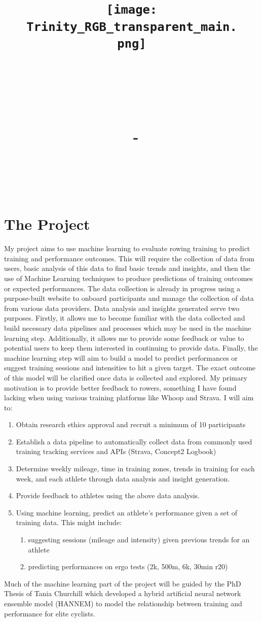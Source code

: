 \documentclass[a4paper]{article}
\title{
    \vspace{-1in}
    \begin{figure}[!ht]
    \flushleft
    \texttt{[image: Trinity\_RGB\_transparent\_main.png]}
    \end{figure}
    \vspace{-0.5cm}
    \hrulefill \\
    \vspace{1cm}
    \textmd{\textbf{\moduleCode\ \moduleName}}\\
    \textmd{\textbf{\assignmentTitle}}\\
    {
        \large
        \textmd{\authorName\ - \authorID}\\
        \textmd{\reportDate}\\
    }
    \vspace{0.5cm}
    \hrulefill \\
}
\date{}
\author{}
\begin{document}
\section{The Project}
My project aims to use machine learning to evaluate rowing training to predict training and performance outcomes. This will require the collection of data from users, basic analysis of this data to find basic trends and insights, and then the use of Machine Learning techniques to produce predictions of training outcomes or expected performances. 
The data collection is already in progress using a purpose-built website to onboard participants and manage the collection of data from various data providers. 
Data analysis and insights generated serve two purposes. Firstly, it allows me to become familiar with the data collected and build necessary data pipelines and processes which may be used in the machine learning step. Additionally, it allows me to provide some feedback or value to potential users to keep them interested in continuing to provide data. 
Finally, the machine learning step will aim to build a model to predict performances or suggest training sessions and intensities to hit a given target. The exact outcome of this model will be clarified once data is collected and explored. My primary motivation is to provide better feedback to rowers, something I have found lacking when using various training platforms like Whoop and Strava.
I will aim to:
\begin{enumerate}
    \item Obtain research ethics approval and recruit a minimum of 10 participants
    \item Establish a data pipeline to automatically collect data from commonly used training tracking services and APIs (Strava, Concept2 Logbook)
    \item Determine weekly mileage, time in training zones, trends in training for each week, and each athlete through data analysis and insight generation.
    \item Provide feedback to athletes using the above data analysis.
    \item Using machine learning, predict an athlete's performance given a set of training data. This might include:
    \begin{enumerate}
        \item suggesting sessions (mileage and intensity) given previous trends for an athlete
        \item predicting performances on ergo tests (2k, 500m, 6k, 30min r20)
    \end{enumerate}
\end{enumerate}
Much of the machine learning part of the project will be guided by the PhD Thesis of Tania Churchill \autocite{Churchill2014} which developed a hybrid artificial neural network ensemble model (HANNEM) to model the relationship between training and performance for elite cyclists.
\end{document}
